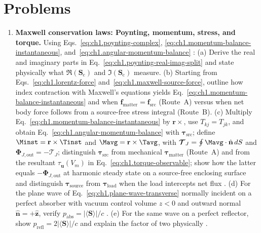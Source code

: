 \section{Problems}
\label{sec:ch01.8}

\begin{enumerate}
\item \textbf{Maxwell conservation laws: Poynting, momentum, stress, and torque.}
Using Eqs.~\eqref{eq:ch1.poynting-complex}, \eqref{eq:ch1.momentum-balance-instantaneous}, and~\eqref{eq:ch1.angular-momentum-balance} \cite{poynting1884,maxwell1873,stratton1941}:
(a) Derive the real and imaginary parts in Eq.~\eqref{eq:ch1.poynting-real-imag-split} and state physically what $\Re(\mathbf{S}_\mathrm{c})$ and $\Im(\mathbf{S}_\mathrm{c})$ measure.
(b) Starting from Eqs.~\eqref{eq:ch1.lorentz-force} and~\eqref{eq:ch1.maxwell-source-force}, outline how index contraction with Maxwell's equations yields Eq.~\eqref{eq:ch1.momentum-balance-instantaneous} and when $\mathbf{f}_{\mathrm{matter}}=\mathbf{f}_{\mathrm{src}}$ (Route~A) versus when net body force follows from a source-free stress integral (Route~B).
(c) Multiply Eq.~\eqref{eq:ch1.momentum-balance-instantaneous} by $\mathbf{r}\times$, use $T_{kj}=T_{jk}$, and obtain Eq.~\eqref{eq:ch1.angular-momentum-balance} with $\boldsymbol{\tau}_{\mathrm{src}}$; define $\Minst=\mathbf{r}\times\Tinst$ and $\Mavg=\mathbf{r}\times\Tavg$, with $\boldsymbol{\mathcal{T}}_J=\oint\Mavg\cdot\hat{\mathbf{n}}\,dS$ and $\boldsymbol{\Phi}_{J,\mathrm{out}}=-\boldsymbol{\mathcal{T}}_J$; distinguish $\boldsymbol{\tau}_{\mathrm{src}}$ from mechanical $\boldsymbol{\tau}_{\mathrm{matter}}$ (Route~A) and from the resultant $\tau_{\hat{\mathbf{u}}}(V_m)$ in Eq.~\eqref{eq:ch1.torque-observable}; show how the latter equals $-\boldsymbol{\Phi}_{J,\mathrm{out}}$ at harmonic steady state on a source-free enclosing surface and distinguish $\boldsymbol{\tau}_{\mathrm{source}}$ from $\boldsymbol{\tau}_{\mathrm{load}}$ when the load intercepts net flux \cite{beth1936}.
(d) For the plane wave of Eq.~\eqref{eq:ch1.plane-wave-transverse} normally incident on a perfect absorber with vacuum control volume $z<0$ and outward normal $\hat{\mathbf{n}}=+\hat{\mathbf{z}}$, verify $p_{\mathrm{abs}}=|\langle\mathbf{S}\rangle|/c$ \cite{stratton1941}.
(e) For the same wave on a perfect reflector, show $p_{\mathrm{refl}}=2|\langle\mathbf{S}\rangle|/c$ and explain the factor of two physically \cite{maxwell1873,stratton1941}.


\end{enumerate}
